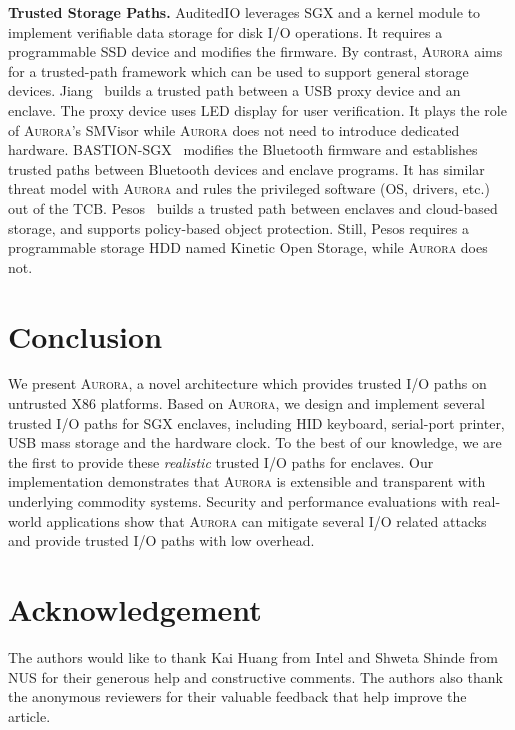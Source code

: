 \textbf{Trusted Storage Paths.}
AuditedIO \cite{DBLP:conf/apsys/BalakrishnanCBS17} leverages SGX and a kernel module to implement verifiable data storage for disk I/O operations. It requires a programmable SSD device and modifies the firmware.
By contrast, \textsc{Aurora} aims for a trusted-path framework which can be used to support general storage devices. %
Jiang~\cite{Jang2017Building} builds a trusted path between a USB proxy device and an enclave. The proxy device uses LED display for user verification. It plays the role of  \textsc{Aurora}'s SMVisor while \textsc{Aurora} does not need to introduce dedicated hardware. %
BASTION-SGX~\cite{DBLP:conf/isca/PetersLVPK18} modifies the Bluetooth firmware and establishes trusted paths between Bluetooth  devices and enclave programs. It has similar threat model with \textsc{Aurora} and rules the privileged software (OS, drivers, etc.) out of the TCB. %
Pesos~\cite{DBLP:conf/eurosys/KrahnTVKBF18} builds a trusted path between enclaves and cloud-based storage, and supports policy-based object protection. Still, Pesos requires a programmable storage HDD named Kinetic Open Storage, while \textsc{Aurora} does not.


\section{Conclusion}

We present \textsc{Aurora}, a novel architecture which provides trusted I/O paths on untrusted X86 platforms. Based on \textsc{Aurora}, we design and implement several trusted I/O paths for SGX enclaves, including HID keyboard, serial-port printer, USB mass storage and the hardware clock. To the best of our knowledge, we are the first to provide these \emph{realistic} trusted I/O paths for enclaves. Our implementation demonstrates that \textsc{Aurora} is extensible and transparent with underlying commodity systems. Security and performance evaluations with real-world applications show that \textsc{Aurora} can mitigate several I/O related attacks and provide trusted I/O paths with low overhead.


\section*{Acknowledgement}

The authors would like to thank Kai Huang from Intel and Shweta Shinde from NUS for their generous help and constructive comments. The authors also thank the anonymous reviewers for their valuable feedback that help improve the article. 

